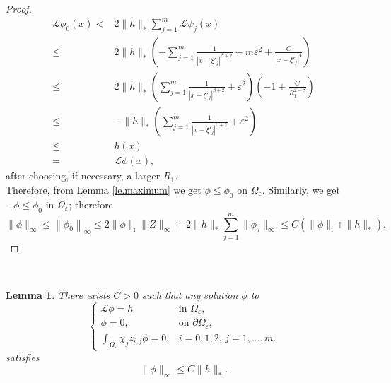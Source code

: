 \documentclass[11pt]{article}
\newtheorem{lemma}{Lemma}[section]
\begin{document}
\begin{proof}
\begin{align*}
\mathcal L\phi_0(x)<&2\|h\|_\ast\sum_{j=1}^m\mathcal L\psi_j(x)\\
\le&2\|h\|_\ast\left(-\sum_{j=1}^m\frac1{\left|x-\xi'_j\right|^{\beta+2}}-m\varepsilon^2+\frac C{\left|x-\xi'_j\right|^4}\right)\\
\le&2\|h\|_\ast\left(\sum_{j=1}^m\frac1{\left|x-\xi'_j\right|^{\beta+2}}+\varepsilon^2\right)\left(-1+\frac C{R_1^{2-\beta}}\right)\\
\le&-\|h\|_\ast\left(\sum_{j=1}^m\frac1{\left|x-\xi'_j\right|^{\beta+2}}+\varepsilon^2\right)\\
\le&h(x)\\
=&\mathcal L\phi(x),
\end{align*}
after choosing, if necessary, a larger $R_1$.\\
Therefore, from Lemma \ref{le.maximum} we get $\phi\le\phi_0$ on $\widetilde\Omega_\varepsilon$. Similarly, we get $-\phi\le\phi_0$ in $\widetilde\Omega_\varepsilon$; therefore
$$\|\phi\|_\infty\le\left\|\phi_0\right\|_\infty\le2\|\phi\|_\imath\|Z\|_\infty+2\|h\|_\ast\sum_{j=1}^m\|\phi_j\|_\infty\le C(\|\phi\|_\imath+\|h\|_\ast).$$
\end{proof}\

\begin{lemma}\label{le. inver1}
There exists $C>0$ such that any solution $\phi$ to
\begin{equation}\label{eq. inver 1}
\left\{\begin{array}{ll}
\mathcal L\phi=h&\text{in }\Omega_\varepsilon,\\
\phi=0,&\text{on }\partial\Omega_\varepsilon,\\
\int_{\Omega_\varepsilon}\chi_jz_{i,j}\phi=0,&i=0,1,2,\,j=1,\dots,m.
\end{array}\right.
\end{equation}
satisfies
$$\|\phi\|_\infty\le C\|h\|_\ast.$$
\end{lemma}
\end{document}
